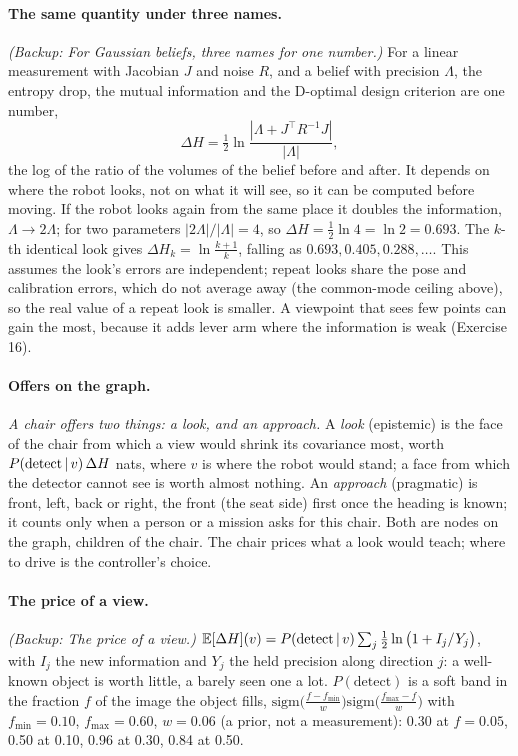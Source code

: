 \documentclass[11pt]{article}
\newcommand{\slt}[1]{\emph{#1}}   %
\begin{document}
\paragraph{The same quantity under three names.} \slt{(Backup: For Gaussian beliefs, three names for one number.)} For a linear measurement with Jacobian $J$ and noise $R$, and a belief with precision $\Lambda$, the entropy drop, the mutual information and the D-optimal design criterion are one number,
\[
\Delta H=\tfrac12\ln\frac{|\Lambda+J^\top R^{-1}J|}{|\Lambda|},
\]
the log of the ratio of the volumes of the belief before and after. It depends on where the robot looks, not on what it will see, so it can be computed before moving. If the robot looks again from the same place it doubles the information, $\Lambda\to2\Lambda$; for two parameters $|2\Lambda|/|\Lambda|=4$, so $\Delta H=\tfrac12\ln4=\ln2=0.693$. The $k$-th identical look gives $\Delta H_k=\ln\frac{k+1}{k}$, falling as $0.693,0.405,0.288,\ldots$. This assumes the look's errors are independent; repeat looks share the pose and calibration errors, which do not average away (the common-mode ceiling above), so the real value of a repeat look is smaller. A viewpoint that sees few points can gain the most, because it adds lever arm where the information is weak (Exercise 16).

\paragraph{Offers on the graph.} \slt{A chair offers two things: a look, and an approach.} A \emph{look} (epistemic) is the face of the chair from which a view would shrink its covariance most, worth $P(\text{detect}\,|\, v)\,\Delta H$ nats, where $v$ is where the robot would stand; a face from which the detector cannot see is worth almost nothing. An \emph{approach} (pragmatic) is front, left, back or right, the front (the seat side) first once the heading is known; it counts only when a person or a mission asks for this chair. Both are nodes on the graph, children of the chair. The chair prices what a look would teach; where to drive is the controller's choice.

\paragraph{The price of a view.} \slt{(Backup: The price of a view.)} $\mathbb{E}[\Delta H](v)=P(\text{detect}\,|\, v)\sum_j\tfrac12\ln\big(1+I_j/Y_j\big)$, with $I_j$ the new information and $Y_j$ the held precision along direction $j$: a well-known object is worth little, a barely seen one a lot. $P(\text{detect})$ is a soft band in the fraction $f$ of the image the object fills, $\mathrm{sigm}\big(\tfrac{f-f_{\min}}{w}\big)\mathrm{sigm}\big(\tfrac{f_{\max}-f}{w}\big)$ with $f_{\min}=0.10$, $f_{\max}=0.60$, $w=0.06$ (a prior, not a measurement): 0.30 at $f=0.05$, 0.50 at 0.10, 0.96 at 0.30, 0.84 at 0.50.
\end{document}
